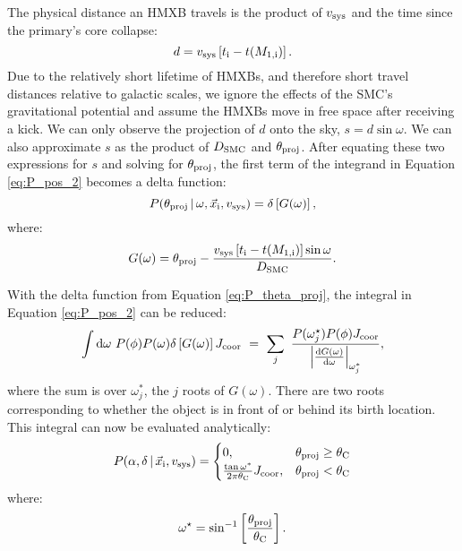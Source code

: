 \documentclass[usenatbib]{mnras}
\newcommand{\given}{\,|\,}
\newcommand{\dd}{\mathrm{d}}
\begin{document}
The physical distance an HMXB travels is the product of $v_{\rm sys}$ and the time since the primary's core collapse:
\begin{equation}
d = v_{\rm sys} \left[t_{\rm i} - t(M_{\rm 1,i}) \right].
\end{equation}
Due to the relatively short lifetime of HMXBs, and therefore short travel distances relative to galactic scales, we ignore the effects of the SMC's gravitational potential and assume the HMXBs move in free space after receiving a kick. We can only observe the projection of $d$ onto the sky, $s = d \sin \omega$. We can also approximate $s$ as the product of $D_{\rm SMC}$ and $\theta_{\rm proj}$. After equating these two expressions for $s$ and solving for $\theta_{\rm proj}$, the first term of the integrand in Equation \ref{eq:P_pos_2} becomes a delta function:
\begin{equation}
P(\theta_{\rm proj} \given \omega, \vec{x}_{\rm i}, v_{\rm sys}) = \delta \left[G(\omega)\right], \label{eq:P_theta_proj}
\end{equation}
where:
\begin{equation}
G(\omega) = \theta_{\rm proj} - \frac{v_{\rm sys} \left[t_{\rm i} - t(M_{\rm 1,i}) \right] \sin \omega}{D_{\rm SMC}}.\end{equation}


With the delta function from Equation \ref{eq:P_theta_proj}, the integral in Equation \ref{eq:P_pos_2} can be reduced:
\begin{equation}
\int \dd \omega\ P(\phi) P(\omega) \delta \left[ G(\omega) \right]  J_{\rm coor}\  =\ \sum_j\ \frac{P(\omega_j^{\star}) P(\phi)  J_{\rm coor}}{ \left| \frac{ \dd G (\omega) }{\dd \omega} \right|_{\omega_j^*}},
\end{equation}
where the sum is over $\omega_j^*$, the $j$ roots of $G(\omega)$. There are two roots corresponding to whether the object is in front of or behind its birth location. This integral can now be evaluated analytically:
\begin{equation}
P(\alpha, \delta \given \vec{x}_{\rm i}, v_{\rm sys} ) =
\begin{cases} 
      0, & \theta_{\rm proj} \geq \theta_{\rm C}\\
     \frac{\tan \omega^*}{2 \pi \theta_{\rm C}}  J_{\rm coor}, & \theta_{\rm proj} < \theta_{\rm C} 
   \end{cases}
\end{equation}
where:
\begin{equation}
\omega^{\star} = \sin^{-1} \left[ \frac{\theta_{\rm proj}}{\theta_{\rm C}} \right].
\end{equation}
\end{document}
